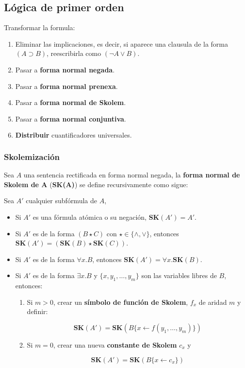 \documentclass[10pt,a4paper]{article}
\begin{document}
\subsection{Lógica de primer orden}
Transformar la formula:
\begin{enumerate}
\item Eliminar las implicaciones, es decir, si aparece una clausula de la forma $(A\supset B)$, reescribirla como $(\lnot A \lor B)$.
\item Pasar a \textbf{forma normal negada}.
\item Pasar a \textbf{forma normal prenexa}.
\item Pasar a \textbf{forma normal de Skolem}.
\item Pasar a \textbf{forma normal conjuntiva}.
\item \textbf{Distribuir} cuantificadores universales.
\end{enumerate}

\subsubsection{Skolemización}

Sea $A$ una sentencia rectificada en forma normal negada, la \textbf{forma normal de Skolem de A} (\textbf{SK(A)}) se define recursivamente como sigue:

Sea $A'$ cualquier subfórmula de $A$, 
\begin{itemize}
\item Si $A'$ es una fórmula atómica o su negación, \textbf{SK}$(A') = A'$.
\item Si $A'$ es de la forma $(B\star C)$ con $\star \in \{\land,\lor\}$, entonces $\textbf{SK}(A') = (\textbf{SK}(B)\star \textbf{SK}(C))$.
\item Si $A'$ es de la forma $\forall x.B$, entonces $\textbf{SK}(A') = \forall x.\textbf{SK}(B)$.
\item Si $A'$ es de la forma $\exists x.B$ y $\{x,y_1,\dots,y_m\}$ son las variables libres de $B$, entonces:
\begin{enumerate}
\item Si $m>0$, crear un \textbf{símbolo de función de Skolem}, $f_x$ de aridad $m$ y definir:

$$\textbf{SK}(A') = \textbf{SK}(B\{ x \leftarrow f(y_1,\dots,y_m)\})$$

\item Si $m=0$, crear una nueva \textbf{constante de Skolem} $c_x$ y

$$\textbf{SK}(A') = \textbf{SK}(B\{ x \leftarrow c_x\})$$

\end{enumerate}
\end{itemize}
\end{document}
